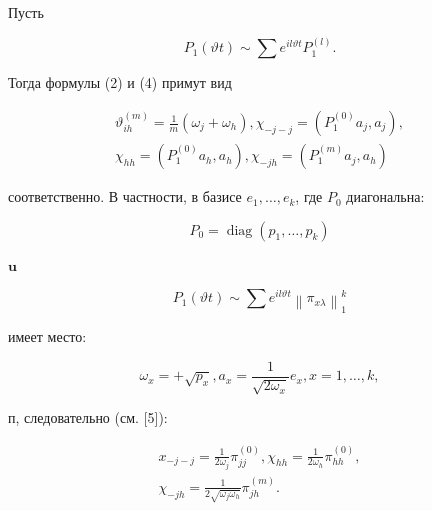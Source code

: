 \documentclass[10pt]{article}
\begin{document}
Пусть



\[

P_{1}(\vartheta t) \sim \sum e^{i l \vartheta t} P_{1}^{(l)} .

\]



Тогда формулы (2) и (4) примут вид



\[

\begin{gathered}

\vartheta_{i h}^{(m)}=\frac{1}{m}\left(\omega_{j}+\omega_{h}\right), \chi_{-j-j}=\left(P_{1}^{(0)} a_{j}, a_{j}\right), \\

\chi_{h h}=\left(P_{1}^{(0)} a_{h}, a_{h}\right), \chi_{-j h}=\left(P_{1}^{(m)} a_{j}, a_{h}\right)

\end{gathered}

\]



соответственно. В частности, в базисе $e_{1}, \ldots, e_{k}$, где $P_{0}$ диагональна:



\[

P_{0}=\operatorname{diag}\left(p_{1}, \ldots, p_{k}\right)

\]



$\mathbf{u}$



\[

P_{1}(\vartheta t) \sim \sum e^{i l \vartheta t}\left\|\pi_{x \lambda}\right\|_{1}^{k}

\]



имеет место:



\[

\omega_{x}=+\sqrt{p_{x}}, a_{x}=\frac{1}{\sqrt{2 \omega_{x}}} e_{x}, x=1, \ldots, k,

\]



п, следовательно (см. [5]):



\[

\begin{gathered}

x_{-j-j}=\frac{1}{2 \omega_{j}} \pi_{j j}^{(0)}, \chi_{h h}=\frac{1}{2 \omega_{h}} \pi_{h h}^{(0)}, \\

\chi_{-j h}=\frac{1}{2 \sqrt{\omega_{j} \omega_{h}}} \pi_{j h}^{(m)} .

\end{gathered}

\]
\end{document}

